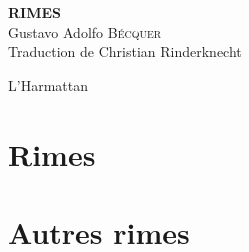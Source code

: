 \documentclass[a4paper,fontsize=13pt,twoside,final]{scrbook}
\begin{document}
\thispagestyle{empty}

\vspace*{70mm}

\begin{center}
{\Huge\textbf{RIMES}} \\
\bigskip
{\Large Gustavo Adolfo \textsc{Bécquer}} \\
\bigskip
Traduction de Christian Rinderknecht
\end{center}

\bigskip\bigskip\bigskip

\vfill
\begin{center}
L'Harmattan
\end{center}

\cleardoublepage


%

%

\setcounter{page}{7}

\part{Rimes}


\part{Autres rimes}


\bigskip

\tableofcontents
\end{document}
